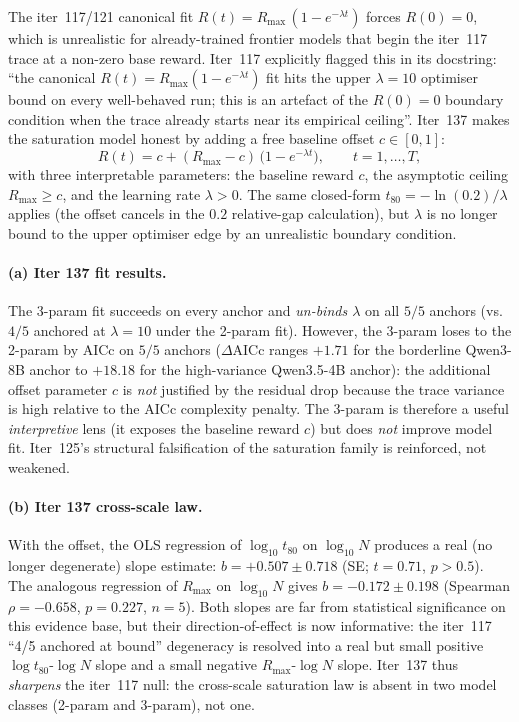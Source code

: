 The iter~117/121 canonical fit $R(t) = R_{\max}\,(1 - e^{-\lambda t})$
forces $R(0)=0$, which is unrealistic for already-trained frontier
models that begin the iter~117 trace at a non-zero base reward.
Iter~117 explicitly flagged this in its docstring: ``the canonical
$R(t)=R_{\max}(1-e^{-\lambda t})$ fit hits the upper $\lambda=10$
optimiser bound on every well-behaved run; this is an artefact of
the $R(0)=0$ boundary condition when the trace already starts near
its empirical ceiling''.  Iter~137 makes the saturation model
honest by adding a free baseline offset $c \in [0, 1]$:
\begin{equation}
  \label{eq:sat-3p}
  R(t) = c + (R_{\max} - c)\,\bigl(1 - e^{-\lambda t}\bigr),
  \qquad t = 1, \dots, T,
\end{equation}
with three interpretable parameters: the baseline reward $c$, the
asymptotic ceiling $R_{\max} \ge c$, and the learning rate
$\lambda > 0$.  The same closed-form
$t_{80} = -\ln(0.2)/\lambda$ applies (the offset cancels in the
$0.2$ relative-gap calculation), but $\lambda$ is no longer bound
to the upper optimiser edge by an unrealistic boundary condition.

\paragraph{(a) Iter 137 fit results.}
\label{par:scaling-iter137-fits}

The 3-param fit succeeds on every anchor and \emph{un-binds
$\lambda$} on all $5/5$ anchors (vs.~$4/5$ anchored at $\lambda=10$
under the 2-param fit).  However, the 3-param loses to the
2-param by AICc on $5/5$ anchors ($\Delta\mathrm{AICc}$ ranges
$+1.71$ for the borderline Qwen3-8B anchor to $+18.18$ for the
high-variance Qwen3.5-4B anchor): the additional offset parameter
$c$ is \emph{not} justified by the residual drop because the
trace variance is high relative to the AICc complexity penalty.
The 3-param is therefore a useful \emph{interpretive} lens (it
exposes the baseline reward $c$) but does \emph{not} improve
model fit.  Iter~125's structural falsification of the
saturation family is reinforced, not weakened.

\paragraph{(b) Iter 137 cross-scale law.}
\label{par:scaling-iter137-cross-scale}

With the offset, the OLS regression of $\log_{10} t_{80}$ on
$\log_{10} N$ produces a real (no longer degenerate) slope
estimate: $b = +0.507 \pm 0.718$ (SE; $t = 0.71$, $p > 0.5$).
The analogous regression of $R_{\max}$ on $\log_{10} N$ gives
$b = -0.172 \pm 0.198$ (Spearman $\rho = -0.658$, $p = 0.227$,
$n = 5$).  Both slopes are far from statistical significance on
this evidence base, but their direction-of-effect is now
informative: the iter~117 ``4/5 anchored at bound'' degeneracy is
resolved into a real but small positive $\log t_{80}$-$\log N$
slope and a small negative $R_{\max}$-$\log N$ slope.  Iter~137
thus \emph{sharpens} the iter~117 null: the cross-scale
saturation law is absent in two model classes (2-param and
3-param), not one.

